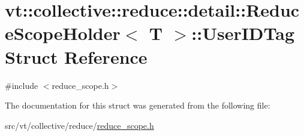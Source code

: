 \hypertarget{structvt_1_1collective_1_1reduce_1_1detail_1_1_reduce_scope_holder_1_1_user_i_d_tag}{}\section{vt\+:\+:collective\+:\+:reduce\+:\+:detail\+:\+:Reduce\+Scope\+Holder$<$ T $>$\+:\+:User\+I\+D\+Tag Struct Reference}
\label{structvt_1_1collective_1_1reduce_1_1detail_1_1_reduce_scope_holder_1_1_user_i_d_tag}


{\ttfamily \#include $<$reduce\+\_\+scope.\+h$>$}



The documentation for this struct was generated from the following file\+:\begin{DoxyCompactItemize}
\item 
src/vt/collective/reduce/\hyperlink{reduce__scope_8h}{reduce\+\_\+scope.\+h}\end{DoxyCompactItemize}
